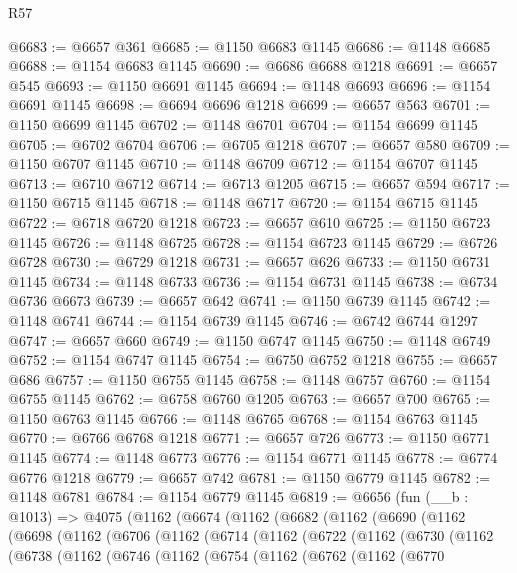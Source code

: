 \begin{lexlean}{R57}
\begin{coremodule}
@6683 := @6657 @361
@6685 := @1150 @6683 @1145
@6686 := @1148 @6685
@6688 := @1154 @6683 @1145
@6690 := @6686 @6688 @1218
@6691 := @6657 @545
@6693 := @1150 @6691 @1145
@6694 := @1148 @6693
@6696 := @1154 @6691 @1145
@6698 := @6694 @6696 @1218
@6699 := @6657 @563
@6701 := @1150 @6699 @1145
@6702 := @1148 @6701
@6704 := @1154 @6699 @1145
@6705 := @6702 @6704
@6706 := @6705 @1218
@6707 := @6657 @580
@6709 := @1150 @6707 @1145
@6710 := @1148 @6709
@6712 := @1154 @6707 @1145
@6713 := @6710 @6712
@6714 := @6713 @1205
@6715 := @6657 @594
@6717 := @1150 @6715 @1145
@6718 := @1148 @6717
@6720 := @1154 @6715 @1145
@6722 := @6718 @6720 @1218
@6723 := @6657 @610
@6725 := @1150 @6723 @1145
@6726 := @1148 @6725
@6728 := @1154 @6723 @1145
@6729 := @6726 @6728
@6730 := @6729 @1218
@6731 := @6657 @626
@6733 := @1150 @6731 @1145
@6734 := @1148 @6733
@6736 := @1154 @6731 @1145
@6738 := @6734 @6736 @6673
@6739 := @6657 @642
@6741 := @1150 @6739 @1145
@6742 := @1148 @6741
@6744 := @1154 @6739 @1145
@6746 := @6742 @6744 @1297
@6747 := @6657 @660
@6749 := @1150 @6747 @1145
@6750 := @1148 @6749
@6752 := @1154 @6747 @1145
@6754 := @6750 @6752 @1218
@6755 := @6657 @686
@6757 := @1150 @6755 @1145
@6758 := @1148 @6757
@6760 := @1154 @6755 @1145
@6762 := @6758 @6760 @1205
@6763 := @6657 @700
@6765 := @1150 @6763 @1145
@6766 := @1148 @6765
@6768 := @1154 @6763 @1145
@6770 := @6766 @6768 @1218
@6771 := @6657 @726
@6773 := @1150 @6771 @1145
@6774 := @1148 @6773
@6776 := @1154 @6771 @1145
@6778 := @6774 @6776 @1218
@6779 := @6657 @742
@6781 := @1150 @6779 @1145
@6782 := @1148 @6781
@6784 := @1154 @6779 @1145
@6819 := @6656
    (fun (__b : @1013) =>
    @4075
      (@1162
        (@6674
          (@1162
            (@6682
              (@1162
                (@6690
                  (@1162
                    (@6698
                      (@1162
                        (@6706
                          (@1162
                            (@6714
                              (@1162
                                (@6722
                                  (@1162
                                    (@6730
                                      (@1162
                                        (@6738
                                          (@1162
                                            (@6746
                                              (@1162
                                                (@6754
                                                  (@1162
                                                    (@6762
                                                      (@1162
                                                        (@6770

\end{coremodule}
\end{lexlean}
